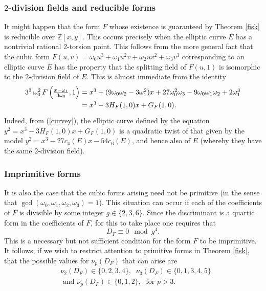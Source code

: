 \subsubsection{$2$-division fields and reducible forms}
It might happen that the form $F$ whose existence is guaranteed by Theorem \ref{fisk} is reducible over $\mathbb{Z}[x,y]$. This occurs precisely when the elliptic curve $E$ has a nontrivial rational $2$-torsion point. This follows from the more general fact that the cubic form $F(u,v) =  \omega_0 u^3 + \omega_1 u^2v + \omega_2 uv^2 + \omega_3 v^3$ corresponding to an elliptic curve $E$ has the property that the splitting field of $F(u,1)$ is isomorphic to the $2$-division field of $E$. This is almost immediate from the identity
$$
\arraycolsep=1.4pt\def\arraystretch{1.4}
\begin{array}{ll}
3^3 \, \omega_0^2 \, F \left( \frac{x-\omega_1}{3 \omega_0},1 \right) & = x^3+(9 \omega_0 \omega_2-3 \omega_1^2) x+27 \omega_0^2 \omega_3-9 \omega_0 \omega_1 \omega_2+2 \omega_1^3 \\
 & = x^3 - 3 H_F(1,0) x  + G_F (1,0). \\
\end{array}
$$
Indeed, from (\ref{curvey}), the elliptic curve defined by the equation
$y^2=x^3 - 3 H_F(1,0) x  + G_F (1,0)$
is a quadratic twist of that given by the model $y^2 = x^3 -27 c_4(E) x -54 c_6(E)$, and hence also of $E$ (whereby they have the same $2$-division field).

\subsubsection{Imprimitive forms}
It is also the case that the cubic forms arising need not be primitive (in the sense that $\gcd 
(\omega_0,\omega_1,\omega_2,\omega_3)=1$). This situation can occur if each of 
the coefficients of $F$ is divisible by some integer $g \in \{ 2, 3, 6 \}$. Since the discriminant is a quartic form in the coefficients of $F$, for this to take place one requires that
$$
D_F \equiv 0 \mod{g^4}.
$$
This is a necessary but not sufficient condition for the form $F$ to be imprimitive. It follows, if we wish to restrict attention to primitive forms in Theorem \ref{fisk}, that the possible values for $\nu_p (D_F)$ that can arise are
\begin{align} \label{lumpy}
& \nu_2 (D_F) \in \{ 0, 2, 3, 4 \}, \; \;  \nu_3 (D_F) \in \{ 0, 1, 3, 4, 5 \} \\
& \mbox{ and } \nu_p (D_F) \in \{ 0, 1, 2 \}, \; \mbox{ for } p > 3.
\end{align}


